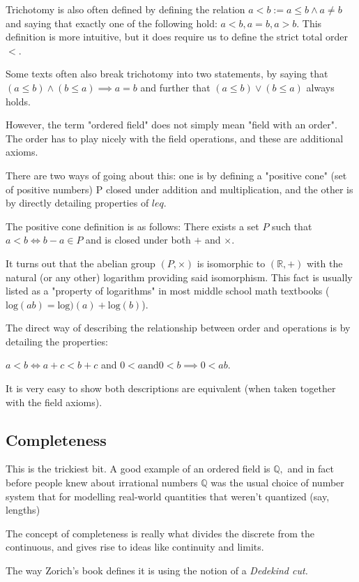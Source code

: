 \documentclass{article}
\newcommand{\0}{{\bf{0}}}
\begin{document}
Trichotomy is also often defined by defining the relation $a<b:= a \leq b \land a \neq b$
and saying that exactly one of the following hold:
$a<b, a=b, a>b.$
This definition is more intuitive, but it does require us to define the strict total order $<$.

Some texts often also break trichotomy into two statements, by saying that $(a \leq b) \land (b \leq a) \implies a=b$ and further that $(a \leq b) \lor (b \leq a)$ always holds.

However, the term "ordered field" does not simply mean "field with an order". The order has to play nicely with the field operations, and these are additional axioms. 

There are two ways of going about this: one is by defining a "positive cone" (set of positive numbers) P closed under addition and multiplication, and the other is by directly detailing properties of $leq.$

The positive cone definition is as follows:
There exists a set $P$ such that $a < b \iff b-a \in P$ and is closed under both $+$ and $\times.$

It turns out that the abelian group $(P, \times)$ is isomorphic to $(\mathbb{R}, +)$ with the natural (or any other) logarithm providing said isomorphism. 
This fact is usually listed as a "property of logarithms" in most middle school math textbooks ($\text{log}(ab) = \text{log})(a) + \text{log}(b)$).

The direct way of describing the relationship between order and operations is by detailing the properties:

$a < b \iff a + c < b + c$ and $0 < a \text{and} 0 < b \implies 0 < ab.$

It is very easy to show both descriptions are equivalent (when taken together with the field axioms). 
\subsection{Completeness}

This is the trickiest bit. A good example of an ordered field is $\mathbb{Q},$ and in fact before people knew about irrational numbers $\mathbb{Q}$ was the usual choice of number system that for modelling real-world quantities that weren't quantized (say, lengths)

The concept of completeness is really what divides the discrete from the continuous, and gives rise to ideas like continuity and limits. 

The way Zorich's book defines it is using the notion of a \textit{Dedekind cut.}
\end{document}
